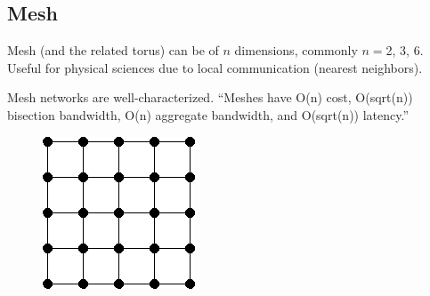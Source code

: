 \documentclass[pdftex]{article}
\begin{document}
\subsection{Mesh}
Mesh (and the related torus) can be of $n$ dimensions, commonly $n=$2, 3, 6. Useful for physical sciences due to local communication (nearest neighbors).

Mesh networks are well-characterized. ``Meshes have O(n) cost, O(sqrt(n)) bisection bandwidth, O(n) aggregate bandwidth, and O(sqrt(n)) latency.''

\begin{figure}[h!]
\begin{center}
 \includegraphics[scale=.5]{pictures/mesh}
\end{center}
\end{figure}
\end{document}
